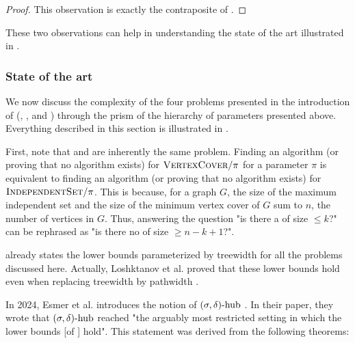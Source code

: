 \begin{proof}
    This observation is exactly the contraposite of .
\end{proof}

\medskip

These two observations can help in understanding the state of the art illustrated in .

\subsubsection*{State of the art}



We now discuss the complexity of the four problems presented in the introduction of  (, ,  and ) through the prism of the hierarchy of parameters presented above. Everything described in this section is illustrated in .

\medskip

First, note that  and  are inherently the same problem. Finding an algorithm (or proving that no algorithm exists) for $\textsc{VertexCover}/\pi$ for a parameter $\pi$ is equivalent to finding an algorithm (or proving that no algorithm exists) for $\textsc{IndependentSet}/\pi$. This is because, for a graph $G$, the size of the maximum independent set and the size of the minimum vertex cover of $G$ sum to $n$, the number of vertices in $G$. Thus, answering the question "is there a  of size $\leq k$?" can be rephrased as "is there no  of size $\geq n - k + 1$?".

\medskip

 already states the lower bounds parameterized by treewidth for all the problems discussed here. Actually, Loshktanov et al. proved that these lower bounds hold even when replacing treewidth by pathwidth \cite{lokshtanov2011known}.

In 2024, Esmer et al. introduces the notion of $(\sigma, \delta)\text{-hub}$ \cite{esmer2024fundamental}. In their paper, they wrote that $(\sigma, \delta)\text{-hub}$ reached "the arguably most restricted setting in which the lower bounds [of \cite{lokshtanov2011known}] hold". This statement was derived from the following theorems:

